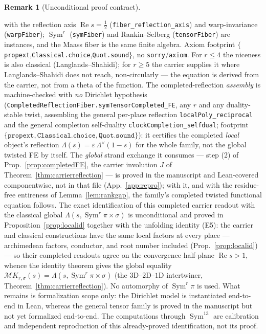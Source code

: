 \documentclass[11pt]{article}
\theoremstyle{definition}
\newtheorem{remark}[theorem]{Remark}
\renewcommand{\Re}{\operatorname{Re}}
\newcommand{\Sym}{\operatorname{Sym}}
\begin{document}
\begin{remark}[Unconditional proof contract]
\begin{enumerate}
\begin{itemize}
with the reflection axis $\Re s=\tfrac12$ (\texttt{fiber\_reflection\_axis}) and warp-invariance
(\texttt{warpFiber}); $\Sym^r$ (\texttt{symFiber}) and Rankin--Selberg (\texttt{tensorFiber}) are
instances, and the Maass fiber is the same finite algebra.  Axiom footprint
$\{$\texttt{propext},\texttt{Classical.choice},\texttt{Quot.sound}$\}$, no \texttt{sorry}/\texttt{axiom}.
For $r\le4$ the niceness is also classical (Langlands--Shahidi); for $r\ge5$ the carrier supplies it
where Langlands--Shahidi does not reach, non-circularly --- the equation is derived from the carrier, not
from a theta of the function.  The completed-reflection \emph{assembly} is machine-checked with \emph{no} Dirichlet hypothesis
(\texttt{CompletedReflectionFiber.symTensorCompleted\_FE}, any $r$ and any duality-stable twist, assembling the
general per-place reflection \texttt{localPoly\_reciprocal} and the general completion self-duality
\texttt{clockCompletion\_selfdual}; footprint
$\{\texttt{propext},\texttt{Classical.choice},\texttt{Quot.sound}\}$): it certifies the completed \emph{local}
object's reflection $\Lambda(s)=\varepsilon\,\Lambda^\vee(1-s)$ for the whole family, not the global twisted FE
by itself. The \emph{global} strand exchange it consumes --- step (2) of Prop.~\ref{prop:completedFE}, the
carrier involution $J$ of Theorem~\ref{thm:carrierreflection} --- is proved in the manuscript and Lean-covered
componentwise, not in that file (App.~\ref{app:repro}); with it, and with the residue-free entireness of
Lemma~\ref{lem:rankgap}, the family's completed twisted functional equation follows.  The exact identification of this completed carrier readout with the classical global
$\Lambda(s,\Sym^r\pi\times\sigma)$ is unconditional and proved in Proposition~\ref{prop:localid} together with the
unfolding identity \textup{(E5)}: the carrier and classical constructions have the same local factors at every
place --- archimedean factors, conductor, and root number included (Prop.~\ref{prop:localid}) --- so their
completed readouts agree on the convergence half-plane $\Re s>1$, whence the identity theorem gives the global
equality $\mathcal M K_{r,\sigma}(s)=\Lambda(s,\Sym^r\pi\times\sigma)$ (the $3$D--$2$D--$1$D intertwiner,
Theorem~\ref{thm:carrierreflection}). No automorphy of $\Sym^r\pi$ is used. What remains is formalization scope
only: the Dirichlet model is instantiated end-to-end in Lean, whereas the general tensor family is proved in the
manuscript but not yet formalized end-to-end. The computations through $\Sym^{13}$ are calibration and independent
reproduction of this already-proved identification, not its proof.


\end{itemize}
\end{enumerate}
\end{remark}
\end{document}
